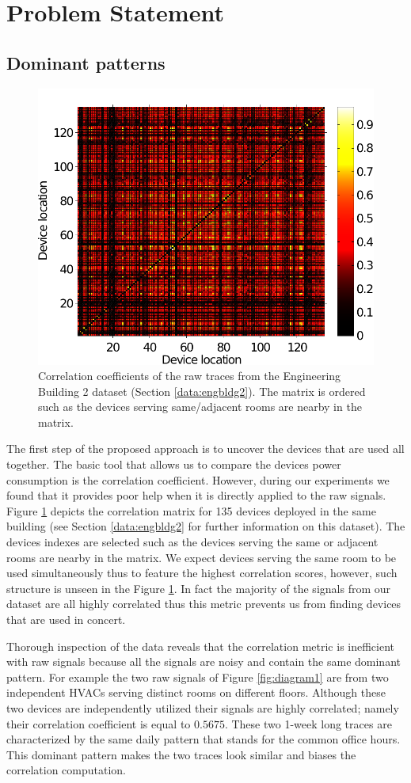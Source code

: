 \section{Problem Statement}
\subsection{Dominant patterns}
\begin{figure}
\begin{center}
\includegraphics[width=.45\textwidth]{img/heatMap_raw_201106-eps-converted-to.pdf}
\caption{Correlation coefficients of the raw traces from the Engineering Building 2 dataset (Section \ref{data:engbldg2}).
The matrix is ordered such as the devices serving same/adjacent rooms are nearby in the matrix.}
\label{fig:heatmap:raw}
\end{center}
\end{figure}

The first step of the proposed approach is to uncover the devices that are used all together.
The basic tool that allows us to compare the devices power consumption is the correlation coefficient.
However, during our experiments we found that it provides poor help when it is directly applied to the raw signals.
Figure \ref{fig:heatmap:raw} depicts the correlation matrix for 135 devices deployed in the same building (see Section \ref{data:engbldg2} for further information on this dataset).
The devices indexes are selected such as the devices serving the same or adjacent rooms are nearby in the matrix.
We expect devices serving the same room to be used simultaneously thus to feature the highest correlation scores, however, such structure is unseen in the Figure \ref{fig:heatmap:raw}.
In fact the majority of the signals from our dataset are all highly correlated thus this metric prevents us from finding devices that are used in concert.

Thorough inspection of the data reveals that the correlation metric is inefficient with raw signals because all the signals are noisy and contain the same dominant pattern.
For example the two raw signals of Figure \ref{fig:diagram1} are from two independent HVACs serving distinct rooms on different floors.
Although these two devices are independently utilized their signals are highly correlated; namely their correlation coefficient is equal to $0.5675$.
These two 1-week long traces are characterized by the same daily pattern that stands for the common office hours.
This dominant pattern makes the two traces look similar and biases the correlation computation.

